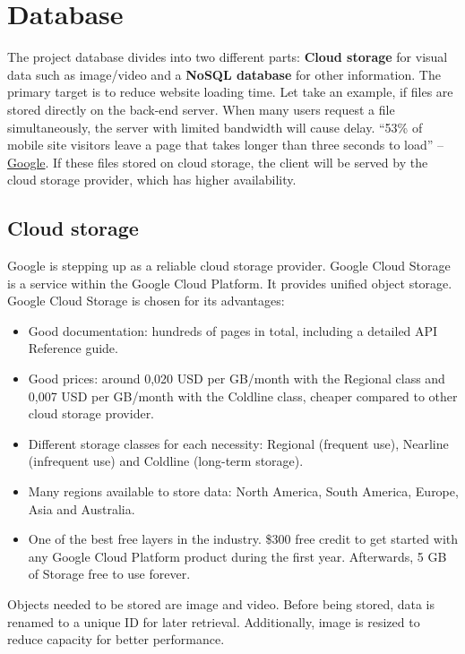 \section{Database}
The project database divides into two different parts: \textbf{Cloud storage} for visual data such as image/video and a \textbf{NoSQL database} for other information. The primary target is to reduce website loading time. Let take an example, if files are stored directly on the back-end server. When many users request a file simultaneously, the server with limited bandwidth will cause delay. “53\% of mobile site visitors leave a page that takes longer than three seconds to load” – \href{https://think.storage.googleapis.com/docs/mobile-page-speed-new-industry-benchmarks.pdf}{Google}. If these files stored on cloud storage, the client will be served by the cloud storage provider, which has higher availability.
\subsection{Cloud storage}
Google is stepping up as a reliable cloud storage provider. Google Cloud Storage is a service within the Google Cloud Platform. It provides unified object storage. 
Google Cloud Storage is chosen for its advantages:
\begin{itemize}
\item Good documentation: hundreds of pages in total, including a detailed API Reference guide.
\item Good prices: around 0,020 USD per GB/month with the Regional class and 0,007 USD per GB/month with the Coldline class, cheaper compared to other cloud storage provider.
\item Different storage classes for each necessity: Regional (frequent use), Nearline (infrequent use) and Coldline (long-term storage).
\item Many regions available to store data: North America, South America, Europe, Asia and Australia.
\item One of the best free layers in the industry. \$300 free credit to get started with any Google Cloud Platform product during the first year. Afterwards, 5 GB of Storage free to use forever.
\end{itemize}
Objects needed to be stored are image and video. Before being stored, data is renamed to a unique ID for later retrieval. Additionally, image is resized to reduce capacity for better performance.
